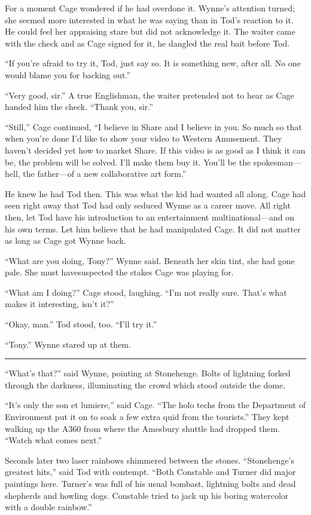 For a moment Cage wondered if he had overdone it. Wynne's attention turned; she seemed more interested in what he was saying than in Tod's reaction to it. He could feel her appraising stare but did not acknowledge it. The waiter came with the check and as Cage signed for it, he dangled the real bait before Tod.

``If you're afraid to try it, Tod, just say so. It is something new, after all. No one would blame you for backing out.''

``Very good, sir.'' A true Englishman, the waiter pretended not to hear as Cage handed him the check. ``Thank you, sir.''

``Still,'' Cage continued, ``I believe in Share and I believe in you. So much so that when you're done I'd like to show your video to Western Amusement. They haven't decided yet how to market Share. If this video is as good as I think it can be, the problem will be solved. I'll make them buy it. You'll be the spokesman---hell, the father---of a new collaborative art form.''

He knew he had Tod then. This was what the kid had wanted all along. Cage had seen right away that Tod had only seduced Wynne as a career move. All right then, let Tod have his introduction to an entertainment multinational---and on his own terms. Let him believe that he had manipulated Cage. It did not matter as long as Cage got Wynne back.

``What are you doing, Tony?'' Wynne said. Beneath her skin tint, she had gone pale. She must havesuspected the stakes Cage was playing for.

``What am I doing?'' Cage stood, laughing. ``I'm not really sure. That's what makes it interesting, isn't it?''

``Okay, man.'' Tod stood, too. ``I'll try it.''

``Tony.'' Wynne stared up at them.

\fancybreak{* * *}

``What's that?'' said Wynne, pointing at Stonehenge. Bolts of lightning forked through the darkness, illuminating the crowd which stood outside the dome.

``It's only the son et lumiere,'' said Cage. ``The holo techs from the Department of Environment put it on to soak a few extra quid from the tourists.'' They kept walking up the A360 from where the Amesbury shuttle had dropped them. ``Watch what comes next.''

Seconds later two laser rainbows shimmered between the stones. ``Stonehenge's greatest hits,'' said Tod with contempt. ``Both Constable and Turner did major paintings here. Turner's was full of his usual bombast, lightning bolts and dead shepherds and howling dogs. Constable tried to jack up his boring watercolor with a double rainbow.''

